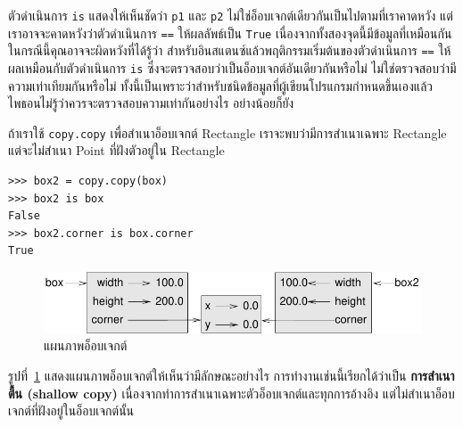 ตัวดำเนินการ {\tt is} แสดงให้เห็นชัดว่า {\tt p1} และ {\tt p2} ไม่ใช่อ็อบเจกต์เดียวกันเป็นไปตามที่เราคาดหวัง 
แต่เราอาจจะคาดหวังว่าตัวดำเนินการ {\tt ==} ให้ผลลัพธ์เป็น {\tt True} เนื่องจากทั้งสองจุดนี้มีข้อมูลที่เหมือนกัน 
ในกรณีนี้คุณอาจจะผิดหวังที่ได้รู้ว่า สำหรับอินสแตนซ์แล้วพฤติกรรมเริ่มต้นของตัวดำเนินการ {\tt ==} ให้ผลเหมือนกับตัวดำเนินการ {\tt is} 
ซึ่งจะตรวจสอบว่าเป็นอ็อบเจกต์อันเดียวกันหรือไม่ ไม่ใช่ตรวจสอบว่ามีความเท่าเทียมกันหรือไม่ 
ทั้งนี้เป็นเพราะว่าสำหรับชนิดข้อมูลที่ผู้เขียนโปรแกรมกำหนดขึ้นเองแล้วไพธอนไม่รู้ว่าควรจะตรวจสอบความเท่ากันอย่างไร อย่างน้อยก็ยัง



ถ้าเราใช้ {\tt copy.copy} เพื่อสำเนาอ็อบเจกต์ Rectangle เราจะพบว่ามีการสำเนาเฉพาะ Rectangle แต่จะไม่สำเนา
Point ที่ฝังตัวอยู่ใน Rectangle

\begin{verbatim}
>>> box2 = copy.copy(box)
>>> box2 is box
False
>>> box2.corner is box.corner
True
\end{verbatim}

\begin{figure}
\centerline
{\includegraphics[scale=0.8]{figs/rectangle2.pdf}}
\caption{แผนภาพอ็อบเจกต์}
\label{fig.rectangle2}
\end{figure}



รูปที่~\ref{fig.rectangle2} แสดงแผนภาพอ็อบเจกต์ให้เห็นว่ามีลักษณะอย่างไร 
การทำงานเช่นนี้เรียกได้ว่าเป็น {\bf การสำเนาตื้น (shallow copy)} เนื่องจากทำการสำเนาเฉพาะตัวอ็อบเจกต์และทุกการอ้างอิง แต่ไม่สำเนาอ็อบเจกต์ที่ฝังอยู่ในอ็อบเจกต์นั้น

